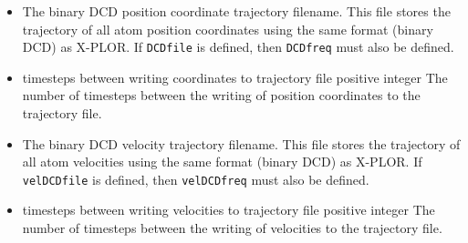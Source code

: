 \begin{itemize}
\item
{}
{
The binary DCD position coordinate trajectory filename.  
This file stores the trajectory of all atom position coordinates 
using the same format (binary DCD) as X-PLOR.  
If \verb!DCDfile! is defined, then \verb!DCDfreq! must also be defined.  
}

\item
{}%
{timesteps between writing coordinates to trajectory file}%
{positive integer}%
{%
The number of timesteps between the writing of position coordinates 
to the trajectory file.  
}

\item
{}
{
The binary DCD velocity trajectory filename.  
This file stores the trajectory of 
all atom velocities using the same format (binary DCD) as X-PLOR.  
If \verb!velDCDfile! is defined, then \verb!velDCDfreq! must also 
be defined.  
}

\item
{}%
{timesteps between writing velocities to trajectory file}%
{positive integer}%
{%
The number of timesteps between the writing of 
velocities to the trajectory file.  
}

%
%
%


\end{itemize}
